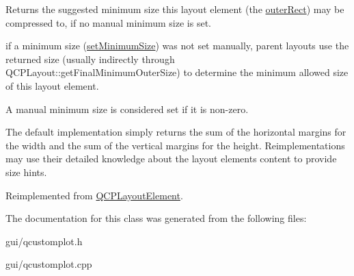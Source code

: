 Returns the suggested minimum size this layout element (the \hyperlink{classQCPLayoutElement_a2a32a12a6161c9dffbadeb9cc585510c}{outer\+Rect}) may be compressed to, if no manual minimum size is set.

if a minimum size (\hyperlink{classQCPLayoutElement_a5dd29a3c8bc88440c97c06b67be7886b}{set\+Minimum\+Size}) was not set manually, parent layouts use the returned size (usually indirectly through Q\+C\+P\+Layout\+::get\+Final\+Minimum\+Outer\+Size) to determine the minimum allowed size of this layout element.

A manual minimum size is considered set if it is non-\/zero.

The default implementation simply returns the sum of the horizontal margins for the width and the sum of the vertical margins for the height. Reimplementations may use their detailed knowledge about the layout element\textquotesingle{}s content to provide size hints. 

Reimplemented from \hyperlink{classQCPLayoutElement_a46789036c4fcb190fa374f91321d7c09}{Q\+C\+P\+Layout\+Element}.



The documentation for this class was generated from the following files\+:\begin{DoxyCompactItemize}
\item 
gui/qcustomplot.\+h\item 
gui/qcustomplot.\+cpp\end{DoxyCompactItemize}

